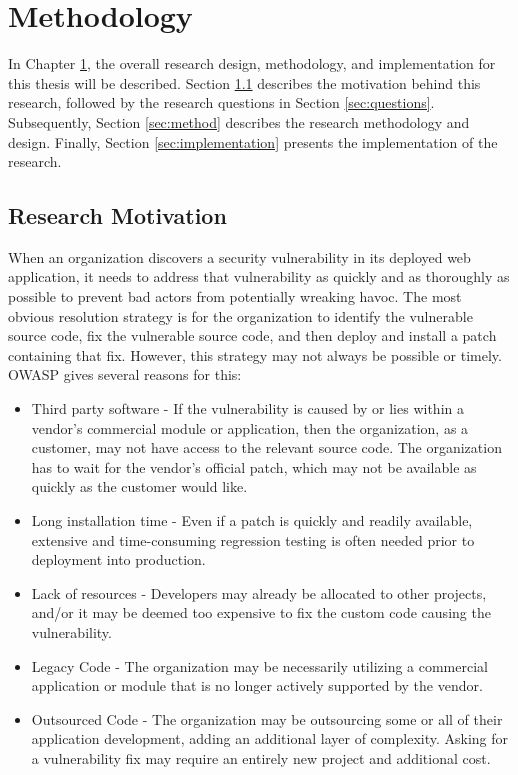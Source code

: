 \chapter{Methodology} \label{chap:method}
In Chapter \ref{chap:method}, the overall research design, methodology, and implementation for this thesis will be described. Section \ref{sec:motivation} describes the motivation behind this research, followed by the research questions in Section \ref{sec:questions}. Subsequently, Section \ref{sec:method} describes the research methodology and design. Finally, Section \ref{sec:implementation} presents the implementation of the research.

\section{Research Motivation} \label{sec:motivation}
When an organization discovers a security vulnerability in its deployed web application, it needs to address that vulnerability as quickly and as thoroughly as possible to prevent bad actors from potentially wreaking havoc. The most obvious resolution strategy is for the organization to identify the vulnerable source code, fix the vulnerable source code, and then deploy and install a patch containing that fix. However, this strategy may not always be possible or timely. OWASP \cite{virtualpatchingbest} \cite{virtualpatchingcheat} gives several reasons for this:

\begin{itemize}
\item Third party software - If the vulnerability is caused by or lies within a vendor's commercial module or application, then the organization, as a customer, may not have access to the relevant source code. The organization has to wait for the vendor's official patch, which may not be available as quickly as the customer would like.

\item Long installation time - Even if a patch is quickly and readily available, extensive and time-consuming regression testing is often needed prior to deployment into production.

\item Lack of resources - Developers may already be allocated to other projects, and/or it may be deemed too expensive to fix the custom code causing the vulnerability.

\item Legacy Code - The organization may be necessarily utilizing a commercial application or module that is no longer actively supported by the vendor.

\item Outsourced Code - The organization may be outsourcing some or all of their application development, adding an additional layer of complexity. Asking for a vulnerability fix may require an entirely new project and additional cost.
\end{itemize}



